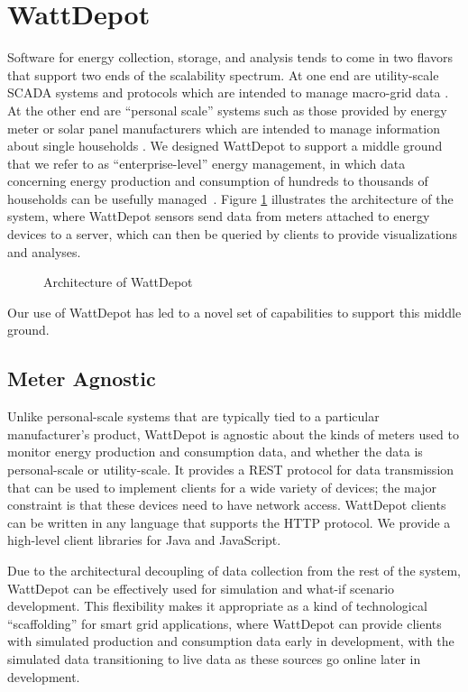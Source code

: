 \section{WattDepot}

Software for energy collection, storage, and analysis tends to come in two flavors that support two ends of the scalability spectrum.  At one end are utility-scale SCADA systems and protocols which are intended to manage macro-grid data \cite{SmartEnergy2.0, OSHAN, OpenPDC}.  At the other end are ``personal scale'' systems such as those provided by energy meter or solar panel manufacturers which are intended to manage information about single households \cite{TED, EMS100}.  We designed WattDepot to support a middle ground that we refer to as ``enterprise-level'' energy management, in which data concerning energy production and consumption of hundreds to thousands of households can be usefully managed~\cite{csdl2-10-05}. Figure \ref{fig:wattdepot} illustrates the architecture of the system, where WattDepot sensors send data from meters attached to energy devices to a server, which can then be queried by clients to provide visualizations and analyses.

\begin{figure}
\begin{center}
\end{center}
\caption{Architecture of WattDepot}
\label{fig:wattdepot}
\end{figure}

Our use of WattDepot has led to a novel set of capabilities to support this middle ground.

\subsection{Meter Agnostic}

Unlike personal-scale systems that are typically tied to a particular manufacturer's product, WattDepot is agnostic about the kinds of meters used to monitor energy production and consumption data, and whether the data is personal-scale or utility-scale. It provides a REST protocol for data transmission that can be used to implement clients for a wide variety of devices; the major constraint is that these devices need to have network access. WattDepot clients can be written in any language that supports the HTTP protocol. We provide a high-level client libraries for Java and JavaScript.

Due to the architectural decoupling of data collection from the rest of the system, WattDepot can be effectively used for simulation and what-if scenario development. This flexibility makes it appropriate as a kind of technological ``scaffolding'' for smart grid applications, where WattDepot can provide clients with simulated production and consumption data early in development, with the simulated data transitioning to live data as these sources go online later in development.

